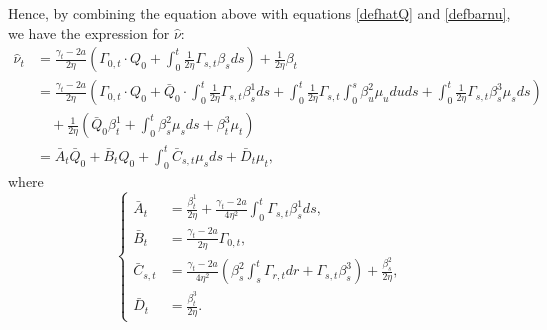 \documentclass[10pt]{article}
\begin{document}
Hence, by combining the equation above with equations \eqref{defhatQ} and \eqref{defbarnu}, we have the expression for $\hat{\nu}$:
{\small
\begin{align*}
    \hat{\nu}_t &= \frac{\gamma_t - 2a}{2\eta} \left( \Gamma_{0,t} \cdot Q_0 + \int_0^t \frac{1}{2\eta} \Gamma_{s,t} \beta_s ds \right) + \frac{1}{2\eta} \beta_t \\
    &= \frac{\gamma_t - 2a}{2\eta} \left( \Gamma_{0,t} \cdot Q_0 
    + \bar{Q}_0 \cdot \int_0^t \frac{1}{2\eta} \Gamma_{s,t} \beta_s^1 ds 
    + \int_0^t \frac{1}{2\eta} \Gamma_{s,t} \int_0^s \beta_u^2 \mu_u du ds 
    + \int_0^t \frac{1}{2\eta} \Gamma_{s,t} \beta_s^3 \mu_s ds \right) \\
    &\quad + \frac{1}{2\eta} \left( \bar{Q}_0 \beta^1_t 
    + \int_0^t \beta_s^2 \mu_s ds + \beta_t^3 \mu_t \right) \\
    &= \bar{A}_t \bar{Q}_0 + \bar{B}_t Q_0 + \int_0^t \bar{C}_{s,t} \mu_s ds + \bar{D}_t \mu_t,
\end{align*}
}
where
\begin{equation}\label{barA_barB_barC_barD_definition}
    \left\{
    \begin{aligned}
        \bar{A}_t &= \frac{\beta_t^1}{2\eta} + \frac{\gamma_t - 2a}{4 \eta^2} \int_0^t \Gamma_{s,t} \beta_s^1 ds, \\
        \bar{B}_t &= \frac{\gamma_t - 2a}{ 2 \eta } \Gamma_{0,t}, \\
        \bar{C}_{s,t} &= \frac{\gamma_t - 2a}{ 4 \eta^2 } \left( \beta_s^2 \int_s^t \Gamma_{r,t} dr + \Gamma_{s,t} \beta_s^3 \right) + \frac{\beta_s^2}{2\eta}, \\
        \bar{D}_t &= \frac{\beta_t^3}{2\eta}.
    \end{aligned}
    \right.
\end{equation}
\end{document}
